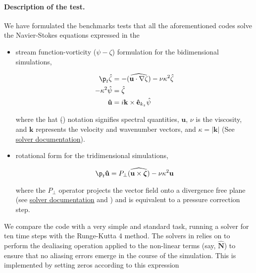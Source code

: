 \paragraph{Description of the test.} We have formulated the benchmarks tests
that all the aforementioned codes solve the Navier-Stokes equations expressed
in the
\begin{itemize}
  \item stream function-vorticity ($\psi-\zeta$) formulation for the
    bidimensional simulations,

    \begin{align*}
      \p_t \hat\zeta &= -(\widehat{\mathbf{u} \cdot \nabla \zeta}) - \nu
        \kappa^2 \hat \zeta \\
      -\kappa^2 \hat \psi &= \hat \zeta \\
      \mathbf{\hat u} &= i\mathbf{k} \times \mathbf{\hat e}_{k_z} \hat \psi
    \end{align*}

  where the hat ($\hat{}$) notation signifies spectral quantities,
  $\mathbf{u}$, $\nu$ is the viscosity, and $\mathbf{k}$ represents the
  velocity and wavenumber vectors,  and $\kappa = |\mathbf{k}|$ (See
  \href{https://fluidsim.readthedocs.io/en/latest/generated/fluidsim.solvers.ns2d.solver.html}{
  solver documentation}).

\item rotational form for the tridimensional simulations,

    \begin{align*}
      \p_t \mathbf{\hat u} = P_\perp \widehat{(\mathbf{u} \times \boldsymbol{\zeta})}
        - \nu \kappa ^ 2 \mathbf{u}
    \end{align*}

    where the $P_\perp$ operator projects the vector field onto a divergence free
    plane (see
  \href{https://fluidsim.readthedocs.io/en/latest/generated/fluidsim.solvers.ns3d.solver.html}{
  solver documentation} and \citet{canuto_algorithms_1988}) and is equivalent
  to a pressure correction step.

\end{itemize}
We compare the code with a very simple and standard task, running a solver for
ten time steps with the Runge-Kutta 4 method. The solvers in 
relies on  to perform the dealiasing operation applied to the
non-linear terms (say, $\mathbf{\hat N}$) to ensure that no aliasing errors emerge in
the course of the simulation. This is implemented by setting zeros according to
this expression

